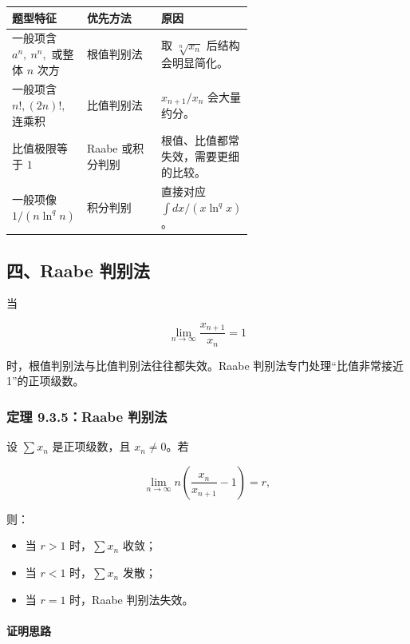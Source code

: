 \begin{center}
\small
\begin{tabularx}{\linewidth}{|>{\raggedright\arraybackslash}p{0.18\linewidth}|>{\raggedright\arraybackslash}p{0.42\linewidth}|>{\raggedright\arraybackslash}X|}
\hline
\textbf{题型特征} & \textbf{优先方法} & \textbf{原因} \\ \hline
一般项含 \(a^n,\ n^n,\) 或整体 \(n\) 次方 & 根值判别法 & 取 \(\sqrt[n]{x_n}\) 后结构会明显简化。 \\ \hline
一般项含 \(n!, (2n)!,\) 连乘积 & 比值判别法 & \(x_{n+1}/x_n\) 会大量约分。 \\ \hline
比值极限等于 \(1\) & Raabe 或积分判别 & 根值、比值都常失效，需要更细的比较。 \\ \hline
一般项像 \(1/(n\ln^q n)\) & 积分判别 & 直接对应 \(\int dx/(x\ln^q x)\)。 \\ \hline
\end{tabularx}
\end{center}

\subsection*{四、Raabe 判别法}

当

\[
      \lim_{n\to\infty}\frac{x_{n+1}}{x_n}=1
    \]

时，根值判别法与比值判别法往往都失效。Raabe 判别法专门处理“比值非常接近 1”的正项级数。

\subsubsection*{定理 9.3.5：Raabe 判别法}

设 \(\sum x_n\) 是正项级数，且 \(x_n\ne0\)。若

\[
      \lim_{n\to\infty} n\left(\frac{x_n}{x_{n+1}}-1\right)=r,
    \]

则：

\begin{itemize}
 \item 当 \(r>1\) 时，\(\sum x_n\) 收敛；
 \item 当 \(r<1\) 时，\(\sum x_n\) 发散；
 \item 当 \(r=1\) 时，Raabe 判别法失效。
 \end{itemize}

\paragraph*{证明思路}

